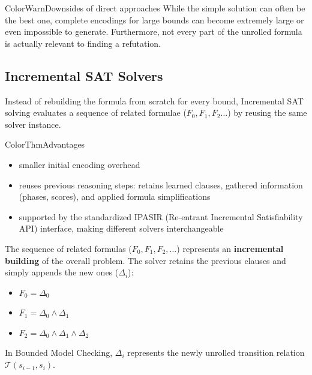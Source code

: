 \documentclass[a4paper, 11pt]{report}
\begin{document}
\begin{cframe}{ColorWarn}{Downsides of direct approaches}
While the simple solution can often be the best one, complete encodings for large bounds can become extremely large or even impossible to generate. Furthermore, not every part of the unrolled formula is actually relevant to finding a refutation.
\end{cframe}

\subsection{Incremental SAT Solvers}
Instead of rebuilding the formula from scratch for every bound, Incremental SAT solving evaluates a sequence of related formulae ($F_0, F_1, F_2 \dots$) by reusing the same solver instance. 


\begin{cframe}{ColorThm}{Advantages}
    \vspace{-1em}
\begin{itemize}
    \item smaller initial encoding overhead
    \item reuses previous reasoning steps: retains learned clauses, gathered information (phases, scores), and applied formula simplifications
    \item supported by the standardized IPASIR (Re-entrant Incremental Satisfiability API) interface, making different solvers interchangeable
\end{itemize}
\end{cframe}

The sequence of related formulas ($F_0, F_1, F_2, \dots$) represents an \textbf{incremental building} of the overall problem. The solver retains the previous clauses and simply appends the new ones ($\Delta_i$):
\begin{itemize}
    \item $F_0 = \Delta_0$
    \item $F_1 = \Delta_0 \wedge \Delta_1$
    \item $F_2 = \Delta_0 \wedge \Delta_1 \wedge \Delta_2$
\end{itemize}

In Bounded Model Checking, $\Delta_i$ represents the newly unrolled transition relation $\mathcal{T}(s_{i-1}, s_i)$.
\end{document}
